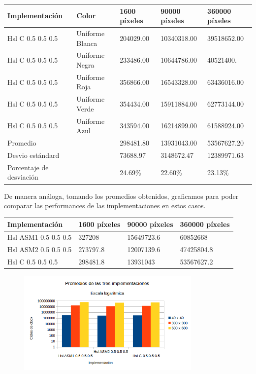 \begin{tabular}{| l | l | l | l | l |}
\hline
Implementación & Color & 1600 píxeles & 90000 píxeles & 360000 píxeles\\
\hline
Hsl C 0.5 0.5 0.5 & Uniforme Blanca & 204029.00	& 10340318.00 & 39518652.00\\ 
\hline
Hsl C 0.5 0.5 0.5 & Uniforme Negra & 233486.00	& 10644786.00 &	40521400.\\ 
\hline
Hsl C 0.5 0.5 0.5 & Uniforme Roja & 356866.00	& 16543328.00	& 63436016.00\\ 
\hline
Hsl C 0.5 0.5 0.5 & Uniforme Verde & 354434.00	& 15911884.00	& 62773144.00\\
\hline
Hsl C 0.5 0.5 0.5 & Uniforme Azul & 343594.00	& 16214899.00	& 61588924.00\\
\hline
Promedio & &  298481.80	& 13931043.00	& 53567627.20\\
\hline
Desvio estándard  &&  73688.97	& 3148672.47	& 12389971.63\\
\hline
Porcentaje de desviación  &&  24.69\%	& 22.60\% & 23.13\%\\
\hline
\end{tabular}

De manera análoga, tomando los promedios obtenidos, graficamos para poder comparar las performances de las implementaciones en estos casos.\\

\begin{tabular}{| l | l | l | l|}
\hline
Implementación	& 1600 píxeles & 90000 píxeles & 360000 píxeles\\
\hline
Hsl ASM1 0.5 0.5 0.5	& 327208	& 15649723.6	& 60852668\\
\hline
Hsl ASM2 0.5 0.5 0.5	&273797.8	& 12007139.6	& 47425804.8\\
\hline
Hsl C 0.5 0.5 0.5	& 298481.8	& 13931043	& 53567627.2\\
\hline
\end{tabular}


\begin{figure}[ht]
\centering
\includegraphics[width=90mm]{hsl/graficoHsl_cte.png}
\end{figure}

